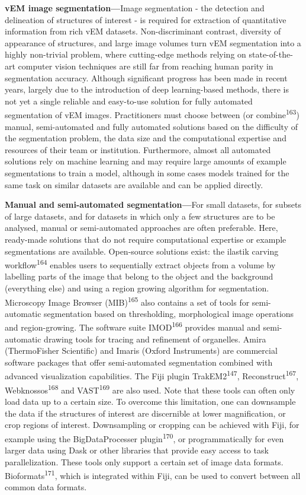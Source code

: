 \documentclass{article}
\begin{document}
\textbf{vEM image segmentation—}Image segmentation - the detection and delineation of structures of interest - is required for extraction of quantitative information from rich vEM datasets. Non-discriminant contrast, diversity of appearance of structures, and large image volumes turn vEM segmentation into a highly non-trivial problem, where cutting-edge methods relying on state-of-the-art computer vision techniques are still far from reaching human parity in segmentation accuracy. Although significant progress has been made in recent years, largely due to the introduction of deep learning-based methods, there is not yet a single reliable and easy-to-use solution for fully automated segmentation of vEM images. Practitioners must choose between (or combine\textsuperscript{163}) manual, semi-automated and fully automated solutions based on the difficulty of the segmentation problem, the data size and the computational expertise and resources of their team or institution. Furthermore, almost all automated solutions rely on machine learning and may require large amounts of example segmentations to train a model, although in some cases models trained for the same task on similar datasets are available and can be applied directly.

\textbf{Manual and semi-automated segmentation—}For small datasets, for subsets of large datasets, and for datasets in which only a few structures are to be analysed, manual or semi-automated approaches are often preferable. Here, ready-made solutions that do not require computational expertise or example segmentations are available. Open-source solutions exist: the ilastik carving workflow\textsuperscript{164} enables users to sequentially extract objects from a volume by labelling parts of the image that belong to the object and the background (everything else) and using a region growing algorithm for segmentation. Microscopy Image Browser (MIB)\textsuperscript{165} also contains a set of tools for semi-automatic segmentation based on thresholding, morphological image operations and region-growing. The software suite IMOD\textsuperscript{166} provides manual and semi-automatic drawing tools for tracing and refinement of organelles. Amira (ThermoFisher Scientific) and Imaris (Oxford Instruments) are commercial software packages that offer semi-automated segmentation combined with advanced visualization capabilities. The Fiji plugin TrakEM2\textsuperscript{147}, Reconstruct\textsuperscript{167}, Webknossos\textsuperscript{168} and VAST\textsuperscript{169} are also used. Note that these tools can often only load data up to a certain size. To overcome this limitation, one can downsample the data if the structures of interest are discernible at lower magnification, or crop regions of interest. Downsampling or cropping can be achieved with Fiji, for example using the BigDataProcesser plugin\textsuperscript{170}, or programmatically for even larger data using Dask or other libraries that provide easy access to task parallelization. These tools only support a certain set of image data formats. Bioformats\textsuperscript{171}, which is integrated within Fiji, can be used to convert between all common data formats.
\end{document}
